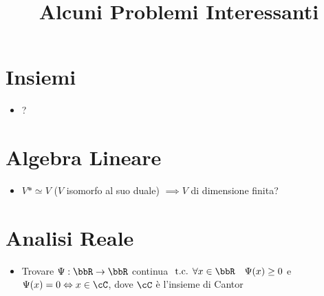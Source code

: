 \documentclass[a4paper,NoNotes,GeneralMath]{stdmdoc}
\begin{document}
	\title{Alcuni Problemi Interessanti}
	\autodate

	\section*{Insiemi}
	\begin{itemize}
		\item ?
	\end{itemize}

	\section*{Algebra Lineare}
	\begin{itemize}
		\item $V* \simeq V$ ($V$ isomorfo al suo duale) $\implies V$ di dimensione finita?
	\end{itemize}

	\section*{Analisi Reale}
	\begin{itemize}
		\item Trovare $\Psi: \bbR\rar\bbR$ continua $\tc \forall x\in\bbR \quad \Psi(x)\ge 0$ e $\Psi(x) = 0 \sse x \in \cC$, dove $\cC$ è l'insieme di Cantor
	\end{itemize}
\end{document}
